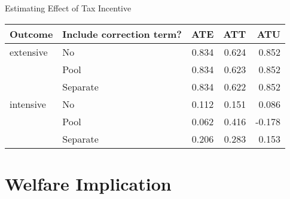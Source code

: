 \documentclass[
  ignorenonframetext,
  aspectratio=169,
]{beamer}
\begin{document}
\begin{frame}{Estimating Effect of Tax Incentive}
\protect\hypertarget{estimating-effect-of-tax-incentive}{}
\begin{table}
\centering
\begin{tabular}[t]{llrrr}
\toprule
Outcome & Include correction term? & ATE & ATT & ATU\\
\midrule
extensive & No & 0.834 & 0.624 & 0.852\\
 & Pool & 0.834 & 0.623 & 0.852\\
 & Separate & 0.834 & 0.622 & 0.852\\
intensive & No & 0.112 & 0.151 & 0.086\\
 & Pool & 0.062 & 0.416 & -0.178\\
 & Separate & 0.206 & 0.283 & 0.153\\
\bottomrule
\end{tabular}
\end{table}
\end{frame}

\hypertarget{welfare-implication}{%
\section{Welfare Implication}\label{welfare-implication}}
\end{document}
